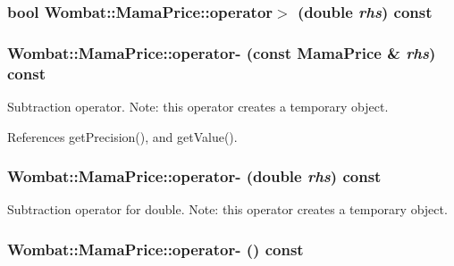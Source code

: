 \label{classWombat_1_1MamaPrice_a15247a3fd3b5ec23532836f0f1a543e3}
\hypertarget{classWombat_1_1MamaPrice_a30a0d7f7b1f829ae5f09d07413a28021}{
\subsubsection[{operator$>$}]{\setlength{\rightskip}{0pt plus 5cm}bool Wombat::MamaPrice::operator$>$ (double {\em rhs}) const}}
\label{classWombat_1_1MamaPrice_a30a0d7f7b1f829ae5f09d07413a28021}
\hypertarget{classWombat_1_1MamaPrice_ae9b64c29f40da554a1153bc13eedd1bf}{
\subsubsection[{operator-\/}]{ Wombat::MamaPrice::operator-\/ (const {\bf MamaPrice} \& {\em rhs}) const}}
\label{classWombat_1_1MamaPrice_ae9b64c29f40da554a1153bc13eedd1bf}


Subtraction operator. Note: this operator creates a temporary object. 

References getPrecision(), and getValue().\hypertarget{classWombat_1_1MamaPrice_a94e9fa5bf6b7056ca4cb55c14628869a}{
\subsubsection[{operator-\/}]{ Wombat::MamaPrice::operator-\/ (double {\em rhs}) const}}
\label{classWombat_1_1MamaPrice_a94e9fa5bf6b7056ca4cb55c14628869a}


Subtraction operator for double. Note: this operator creates a temporary object. \hypertarget{classWombat_1_1MamaPrice_ac2c40fd47283c9f703a2f364880138c6}{
\subsubsection[{operator-\/}]{ Wombat::MamaPrice::operator-\/ () const}}
\label{classWombat_1_1MamaPrice_ac2c40fd47283c9f703a2f364880138c6}


